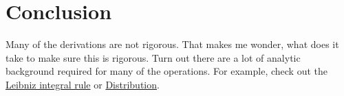 \documentclass{article}
\begin{document}
\section*{Conclusion}
Many of the derivations are not rigorous. That makes me wonder, what does it take to make sure this is rigorous. Turn out there are a lot of analytic background required for many of the operations. For example, check out the \href{https://en.wikipedia.org/wiki/Leibniz_integral_rule}{Leibniz integral rule} or \href{https://en.wikipedia.org/wiki/Distribution_(mathematics)}{Distribution}.
\end{document}
